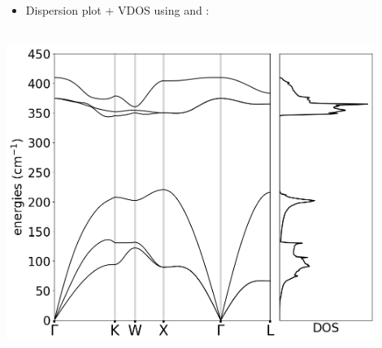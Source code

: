 \documentclass[landscape]{foils}
\begin{document}
\parbox{18cm}{
\begin{itemize}
	\item  Dispersion plot + VDOS using  and :\\
		\\
\end{itemize}
}
\vskip 2cm 
\begin{center}
\parbox{14cm}{
	\includegraphics[width=12cm]{../../Day2/PHONON/Exercise2/Reference/disp_and_dos.png} 
	}
\end{center}
\end{document}

